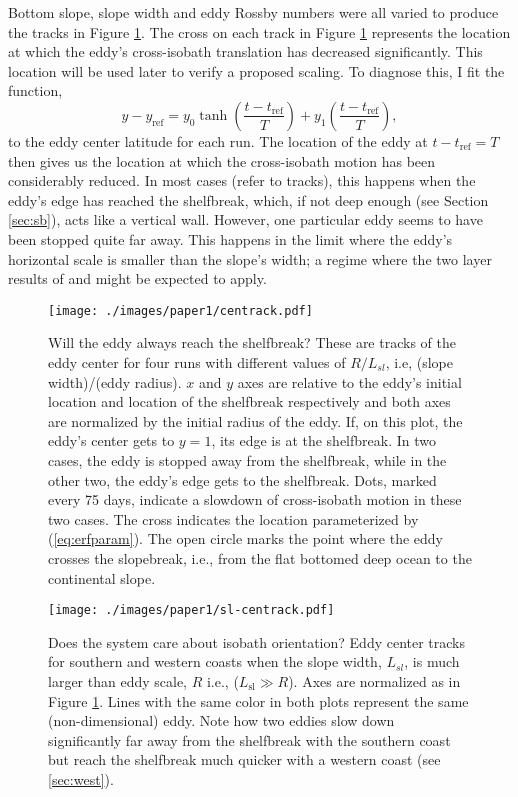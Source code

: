 Bottom slope, slope width and eddy Rossby numbers were all varied to produce the tracks in Figure \ref{fig:centrack}. The cross on each track in Figure \ref{fig:centrack} represents the location at which the eddy's cross-isobath translation has decreased significantly. This location will be used later to verify a proposed scaling. To diagnose this, I fit the function,
\begin{equation}
\label{eq:tanhfit}
y - y_\text{ref} = y_0 \tanh{\left(\frac{t-t_\text{ref}}{T}\right)} + y_1 \left(\frac{t - t_\text{ref}}{T}\right),
\end{equation}
to the eddy center latitude for each run. The location of the eddy at $t - t_\text{ref} = T$ then gives us the location at which the cross-isobath motion has been considerably reduced. In most cases (refer to tracks), this happens when the eddy's edge has reached the shelfbreak, which, if not deep enough (see Section \ref{sec:sb}), acts like a vertical wall. However, one particular eddy seems to have been stopped quite far away. This happens in the limit where the eddy's horizontal scale is smaller than the slope's width; a regime where the two layer results of \citet{LaCasce1998} and \citet{Jacob2002} might be expected to apply.

\begin{figure}[htb]
\centering
\texttt{[image: ./images/paper1/centrack.pdf]}
\caption{\label{fig:centrack}Will the eddy always reach the shelfbreak? These are tracks of the eddy center for four runs with different values of $R/L_{sl}$, i.e, (slope width)/(eddy radius). $x$ and $y$ axes are relative to the eddy's initial location and location of the shelfbreak respectively and both axes are normalized by the initial radius of the eddy. If, on this plot, the eddy's center gets to $y=1$, its edge is at the shelfbreak. In two cases, the eddy is stopped away from the shelfbreak, while in the other two, the eddy's edge gets to the shelfbreak. Dots, marked every 75 days, indicate a slowdown of cross-isobath motion in these two cases. The cross indicates the location parameterized by (\ref{eq:erfparam}). The open circle marks the point where the eddy crosses the slopebreak, i.e., from the flat bottomed deep ocean to the continental slope.}
\end{figure}

\begin{figure}[htb]
\centering
\texttt{[image: ./images/paper1/sl-centrack.pdf]}
\caption{\label{fig:sl-centrack}Does the system care about isobath orientation? Eddy center tracks for southern and western coasts when the slope width, $L_{sl}$, is much larger than eddy scale, $R$ i.e., ($L_\text{sl} ≫ R$). Axes are normalized as in Figure \ref{fig:centrack}. Lines with the same color in both plots represent the same (non-dimensional) eddy. Note how two eddies slow down significantly far away from the shelfbreak with the southern coast but reach the shelfbreak much quicker with a western coast (see \ref{sec:west}).}
\end{figure}

